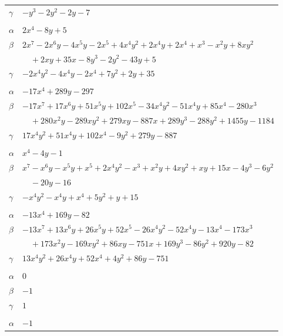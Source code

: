 \documentclass[11pt]{article}
\begin{document}
\begin{longtable}{@{}ll@{}}
$\gamma$ & $-y^{3}-2y^{2}-2y-7$\\
\addlinespace[3pt]
\multicolumn{2}{@{}l}{$\{i,j\}=\{1,24\}$, $k_{ij}=2\cdot 3\cdot 5$}\\
$\alpha$ & $2x^{4}-8y+5$\\
$\beta$ & $2x^{7}-2x^{6}y-4x^{5}y-2x^{5}+4x^{4}y^{2}+2x^{4}y+2x^{4}+x^{3}-x^{2}y+8xy^{2}$\\
 & $\quad +2xy+35x-8y^{3}-2y^{2}-43y+5$\\
$\gamma$ & $-2x^{4}y^{2}-4x^{4}y-2x^{4}+7y^{2}+2y+35$\\
\addlinespace[3pt]
\multicolumn{2}{@{}l}{$\{i,j\}=\{1,25\}$, $k_{ij}=3^{3}\cdot 11$}\\
$\alpha$ & $-17x^{4}+289y-297$\\
$\beta$ & $-17x^{7}+17x^{6}y+51x^{5}y+102x^{5}-34x^{4}y^{2}-51x^{4}y+85x^{4}-280x^{3}$\\
 & $\quad +280x^{2}y-289xy^{2}+279xy-887x+289y^{3}-288y^{2}+1455y-1184$\\
$\gamma$ & $17x^{4}y^{2}+51x^{4}y+102x^{4}-9y^{2}+279y-887$\\
\addlinespace[3pt]
\multicolumn{2}{@{}l}{$\{i,j\}=\{1,32\}$, $k_{ij}=2^{4}$}\\
$\alpha$ & $x^{4}-4y-1$\\
$\beta$ & $x^{7}-x^{6}y-x^{5}y+x^{5}+2x^{4}y^{2}-x^{3}+x^{2}y+4xy^{2}+xy+15x-4y^{3}-6y^{2}$\\
 & $\quad -20y-16$\\
$\gamma$ & $-x^{4}y^{2}-x^{4}y+x^{4}+5y^{2}+y+15$\\
\addlinespace[3pt]
\multicolumn{2}{@{}l}{$\{i,j\}=\{1,33\}$, $k_{ij}=2^{4}\cdot 3^{2}\cdot 11$}\\
$\alpha$ & $-13x^{4}+169y-82$\\
$\beta$ & $-13x^{7}+13x^{6}y+26x^{5}y+52x^{5}-26x^{4}y^{2}-52x^{4}y-13x^{4}-173x^{3}$\\
 & $\quad +173x^{2}y-169xy^{2}+86xy-751x+169y^{3}-86y^{2}+920y-82$\\
$\gamma$ & $13x^{4}y^{2}+26x^{4}y+52x^{4}+4y^{2}+86y-751$\\
\addlinespace[3pt]
\multicolumn{2}{@{}l}{$\{i,j\}=\{2,3\}$, $k_{ij}=2$}\\
$\alpha$ & $0$\\
$\beta$ & $-1$\\
$\gamma$ & $1$\\
\addlinespace[3pt]
\multicolumn{2}{@{}l}{$\{i,j\}=\{2,4\}$, $k_{ij}=2^{3}$}\\
$\alpha$ & $-1$\\

\end{longtable}
\end{document}
